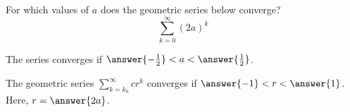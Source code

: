 \documentclass{ximera}
\author{Jim Talamo}
\begin{document}
\begin{exercise}
For which values of $a$ does the geometric series below converge? 
\[
\sum_{k=0}^{\infty} \left(2a\right)^k
\]

The series converges if $\answer{-\frac{1}{2}}<a<\answer{\frac{1}{2}}$.

\begin{hint}
The geometric series $\sum_{k=k_0}^{\infty} cr^k$ converges if $\answer{-1} < r < \answer{1}$.  Here, $r = \answer{2a}$.
\end{hint}
\end{exercise}
\end{document}

